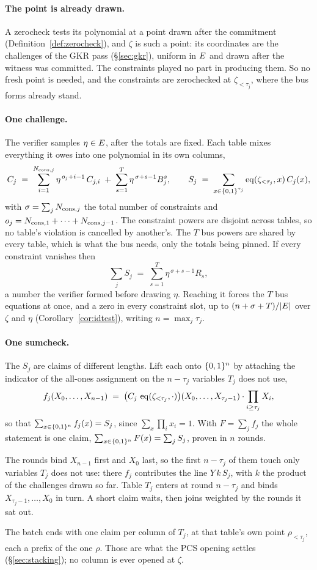 \paragraph{The point is already drawn.} A zerocheck tests its polynomial at a point drawn after the commitment (Definition~\ref{def:zerocheck}), and $\zeta$ is such a point: its coordinates are the challenges of the GKR pass (\S\ref{sec:gkr}), uniform in $E$ and drawn after the witness was committed. The constraints played no part in producing them. So no fresh point is needed, and the constraints are zerochecked at $\zeta_{<\tau_j}$, where the bus forms already stand.

\paragraph{One challenge.} The verifier samples $\eta\in E$, after the totals are fixed. Each table mixes everything it owes into one polynomial in its own columns,
\[
  C_j\;=\;\sum_{i=1}^{N_{\mathrm{cons},j}}\eta^{\,o_j+i-1}\,C_{j,i}
  \;+\;\sum_{s=1}^{T}\eta^{\,\sigma+s-1}B^{s}_j,
  \qquad
  S_j\;=\;\sum_{x\in\{0,1\}^{\tau_j}}\operatorname{eq}(\zeta_{<\tau_j},x)\,C_j(x),
\]
with $\sigma=\sum_jN_{\mathrm{cons},j}$ the total number of constraints and $o_j=N_{\mathrm{cons},1}+\dots+N_{\mathrm{cons},j-1}$. The constraint powers are disjoint across tables, so no table's violation is cancelled by another's. The $T$ bus powers are shared by every table, which is what the bus needs, only the totals being pinned. If every constraint vanishes then
\[
  \sum_j S_j\;=\;\sum_{s=1}^{T}\eta^{\,\sigma+s-1}R_{s},
\]
a number the verifier formed before drawing $\eta$. Reaching it forces the $T$ bus equations at once, and a zero in every constraint slot, up to $(n+\sigma+T)/|E|$ over $\zeta$ and $\eta$ (Corollary~\ref{cor:idtest}), writing $n=\max_j\tau_j$.

\paragraph{One sumcheck.} The $S_j$ are claims of different lengths. Lift each onto $\{0,1\}^{n}$ by attaching the indicator of the all-ones assignment on the $n-\tau_j$ variables $T_j$ does not use,
\[
  f_j(X_0,\dots,X_{n-1})\;=\;\bigl(C_j\,\operatorname{eq}(\zeta_{<\tau_j},\cdot)\bigr)(X_0,\dots,X_{\tau_j-1})\cdot\prod_{i\ge\tau_j}X_i ,
\]
so that $\sum_{x\in\{0,1\}^{n}}f_j(x)=S_j$, since $\sum_x\prod_ix_i=1$. With $F=\sum_jf_j$ the whole statement is one claim, $\sum_{x\in\{0,1\}^{n}}F(x)=\sum_jS_j$, proven in $n$ rounds.

The rounds bind $X_{n-1}$ first and $X_0$ last, so the first $n-\tau_j$ of them touch only variables $T_j$ does not use: there $f_j$ contributes the line $Y\,k\,S_j$, with $k$ the product of the challenges drawn so far. Table $T_j$ enters at round $n-\tau_j$ and binds $X_{\tau_j-1},\dots,X_0$ in turn. A short claim waits, then joins weighted by the rounds it sat out.

The batch ends with one claim per column of $T_j$, at that table's own point $\rho_{<\tau_j}$, each a prefix of the one $\rho$. Those are what the PCS opening settles (\S\ref{sec:stacking}); no column is ever opened at $\zeta$.
